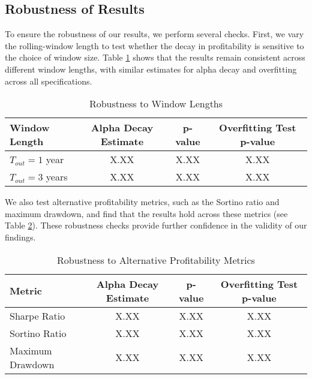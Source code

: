 
\subsection{Robustness of Results}

To ensure the robustness of our results, we perform several checks. First, we vary the rolling-window length to test whether the decay in profitability is sensitive to the choice of window size. Table \ref{tab:robustness_window} shows that the results remain consistent across different window lengths, with similar estimates for alpha decay and overfitting across all specifications.

\begin{table}[H]
    \centering
    \caption{Robustness to Window Lengths}
    \label{tab:robustness_window}
    \begin{tabular}{lccc}
        \hline
        \textbf{Window Length} & \textbf{Alpha Decay Estimate} & \textbf{p-value} & \textbf{Overfitting Test p-value} \\
        \hline
        $T_{out} = 1$ year & X.XX & X.XX & X.XX \\
        $T_{out} = 3$ years & X.XX & X.XX & X.XX \\
        \hline
    \end{tabular}
\end{table}

We also test alternative profitability metrics, such as the Sortino ratio and maximum drawdown, and find that the results hold across these metrics (see Table \ref{tab:robustness_metrics}). These robustness checks provide further confidence in the validity of our findings.

\begin{table}[H]
    \centering
    \caption{Robustness to Alternative Profitability Metrics}
    \label{tab:robustness_metrics}
    \begin{tabular}{lccc}
        \hline
        \textbf{Metric} & \textbf{Alpha Decay Estimate} & \textbf{p-value} & \textbf{Overfitting Test p-value} \\
        \hline
        Sharpe Ratio & X.XX & X.XX & X.XX \\
        Sortino Ratio & X.XX & X.XX & X.XX \\
        Maximum Drawdown & X.XX & X.XX & X.XX \\
        \hline
    \end{tabular}
\end{table}

